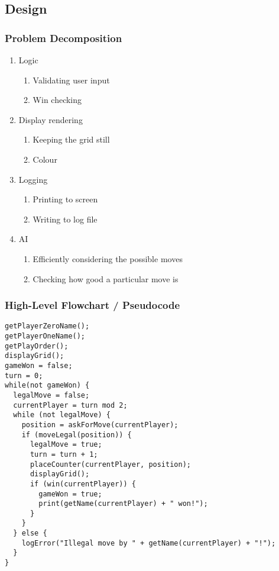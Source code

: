 \documentclass[11pt,onecolumn]{article}
\begin{document}
\subsection{Design}

\subsubsection{Problem Decomposition}

\begin{enumerate}
  \item Logic
  \begin{enumerate}
    \item Validating user input
    \item Win checking
  \end{enumerate}
  \item Display rendering
  \begin{enumerate}
    \item Keeping the grid still
    \item Colour
  \end{enumerate}
  \item Logging
  \begin{enumerate}
    \item Printing to screen
    \item Writing to log file
  \end{enumerate}
  \item AI
  \begin{enumerate}
    \item Efficiently considering the possible moves
    \item Checking how good a particular move is
  \end{enumerate}
\end{enumerate}

\subsubsection{High-Level Flowchart / Pseudocode}

\begin{lstlisting}
getPlayerZeroName();
getPlayerOneName();
getPlayOrder();
displayGrid();
gameWon = false;
turn = 0;
while(not gameWon) {
  legalMove = false;
  currentPlayer = turn mod 2;
  while (not legalMove) {
    position = askForMove(currentPlayer);
    if (moveLegal(position)) {
      legalMove = true;
      turn = turn + 1;
      placeCounter(currentPlayer, position);
      displayGrid();
      if (win(currentPlayer)) {
        gameWon = true;
        print(getName(currentPlayer) + " won!");
      }
    }
  } else {
    logError("Illegal move by " + getName(currentPlayer) + "!");
  }
}
\end{lstlisting}
\end{document}
